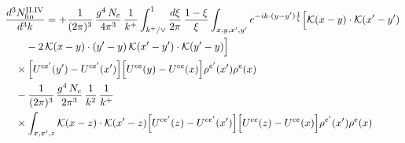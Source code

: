\begingroup\small
\begin{align}\label{eq:H-II.IVrem}
&\frac{d^{3}N^{\rm II.IV}_{{\rm fin}}}{d^{3}k}=+\frac{1}{(2\pi)^{3}}\, \frac{g^{4}\,N_{c}}{4\pi^{3}}\, \frac{1}{k^{+}} \int_{k^{+}/\vee}^{1}\frac{d\xi}{2\pi}\, \frac{1-\xi}{\xi} \int_{x,y,x',y'}e^{-ik\cdot(y-y')\frac{1}{\xi}}\Big[\mathcal{K}(x-y)\cdot\mathcal{K}(x'-y')\notag\\
&\quad\quad -2\, \mathcal{K}(x-y)\cdot(y'-y)\, \mathcal{K}(x'-y')\cdot\mathcal{K}(y'-y)\Big]\notag\\
&\quad \times\Big[U^{ce'}(y') - U^{ce'}(x')\Big]\Big[U^{ce}(y) - U^{ce}(x)\Big]\rho^{e'}(x')\rho^{e}(x)\notag\\
&\quad -\frac{1}{(2\pi)^{3}}\, \frac{g^{4}\,N_{c}}{2\pi^{3}}\, \frac{1}{k^{2}}\, \frac{1}{k^{+}}\notag\\
&\quad \times \int_{x,x',z}\mathcal{K}(x-z)\cdot\mathcal{K}(x'-z)\Big[U^{ce'}(z)-U^{ce'}(x')\Big]\Big[U^{ce}(z)-U^{ce}(x)\Big]\rho^{e'}(x')\rho^{e}(x)
\end{align}
\endgroup
